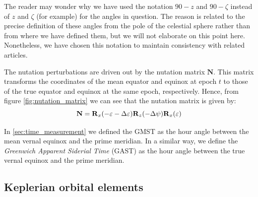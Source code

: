 \documentclass[../main.tex]{subfiles}
\begin{document}
The reader may wonder why we have used the notation $90-z$ and $90-\zeta$ instead of $z$ and $\zeta$ (for example) for the angles in question. The reason is related to the precise definition of these angles from the pole of the celestial sphere rather than from where we have defined them, but we will not elaborate on this point here. Nonetheless, we have chosen this notation to maintain consistency with related articles.

The nutation perturbations are driven out by the nutation matrix $\mathbf{N}$. This matrix transforms the coordinates of the mean equator and equinox at epoch $t$ to those of the true equator and equinox at the same epoch, respectively. Hence, from figure \cref{fig:nutation_matrix} we can see that the nutation matrix is given by:
\begin{equation}
  \mathbf{N}=\boldsymbol{\mathrm{R}}_x(-\varepsilon-\Delta \varepsilon)\boldsymbol{\mathrm{R}}_z(-\Delta \psi)\boldsymbol{\mathrm{R}}_x(\varepsilon)
\end{equation}

In \cref{sec:time_measurement} we defined the GMST as the hour angle between the mean vernal equinox and the prime meridian. In a similar way, we define the \emph{Greenwich Apparent Siderial Time} (GAST) as the hour angle between the true vernal equinox and the prime meridian.
\subsection{Keplerian orbital elements}
\end{document}
